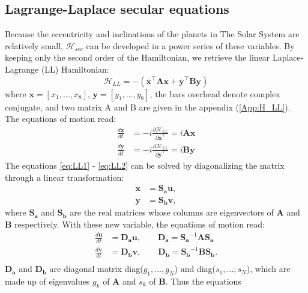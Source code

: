 \documentclass[12pt]{article}
\begin{document}
	\subsection{Lagrange-Laplace secular equations} \label{sec:LL}
	Because the eccentricity and inclinations of the planets in The Solar System are relatively small, $ \mathcal{H}_{sec} $ can be developed in a power series of these variables. By keeping only the second order of the Hamiltonian, we retrieve the linear Laplace-Lagrange (LL) Hamiltonian:
	\begin{equation} \label{H_sec}
	\mathcal{H}_{LL} = - (\boldsymbol{\bar{x}}^\top \mathbf{A} \boldsymbol{x}  + \boldsymbol{\bar{y}}^\top \mathbf{B} \boldsymbol{y} )
	\end{equation}
	where $\boldsymbol{x} = [x_1, \dots, x_8 ]$, $\boldsymbol{y} = [y_1, \dots, y_8 ]$, the bars overhead denote complex conjugate, and two matrix A and B are given in the appendix (\ref{App:H_LL}). The equations of motion read:
	\begin{align} \label{eq:LL1}
	\frac{d \boldsymbol{x}}{dt} &= -i \frac{\partial \mathcal{H}_{LL}}{\partial \boldsymbol{\bar{x}}^\top }= i \mathbf{A} \boldsymbol{x} \\
	\frac{d \boldsymbol{y}}{dt} &= -i \frac{\partial \mathcal{H}_{LL}}{\partial \boldsymbol{\bar{y}}^\top} = i \mathbf{B} \boldsymbol{y} \label{eq:LL2}
	\end{align}
	The equations \ref{eq:LL1}  - \ref{eq:LL2} can be solved by diagonalizing the matrix through a linear transformation:
	\begin{align}
	\boldsymbol{x} &=  \mathbf{S_a} \boldsymbol{u}, \\
	\boldsymbol{y} &=  \mathbf{S_b} \boldsymbol{v}, 
	\end{align}
	where $  \mathbf{S_a} $ and  $  \mathbf{S_b} $ are the real matrices whose columns are eigenvectors of $  \mathbf{A} $ and $  \mathbf{B} $ respectively. With these new variable, the equations of motion read:
	\begin{align}
	\frac{d \boldsymbol{u}}{dt} &=  \mathbf{D_a} \boldsymbol{u}, \qquad  \mathbf{D_a} = \mathbf{S_a}^{-1} \mathbf{A} \mathbf{S_a}  \\
	\frac{d \boldsymbol{v}}{dt} &=  \mathbf{D_b} \boldsymbol{v}, \qquad  \mathbf{D_b} = \mathbf{S_b}^{-1} \mathbf{B} \mathbf{S_b}.  \\
	\end{align}
	$ \mathbf{D_a}$ and $  \mathbf{D_b}$ are diagonal matrix diag($g_1,\dots, g_N$) and diag($s_1,\dots, s_N$), which are made up of eigenvalues $g_k $ of $\mathbf{A}$ and $s_k$ of $\mathbf{B}$. Thus the equations 
\end{document}
